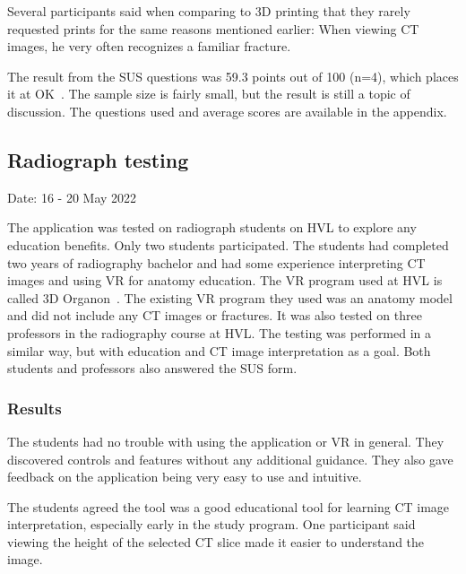 \documentclass[a4paper]{report}
\begin{document}
Several participants said when comparing to 3D printing that they rarely requested prints for the same reasons mentioned earlier: When viewing CT images, he very often recognizes a familiar fracture.



The result from the SUS questions was 59.3 points out of 100 (n=4), which places it at OK~\cite{bangor_empirical_2008}. The sample size is fairly small, but the result is still a topic of discussion. The questions used and average scores are available in the appendix.

\subsection{Radiograph testing}
Date: 16 - 20 May 2022

The application was tested on radiograph students on HVL to explore any education benefits. Only two students participated. The students had completed two years of radiography bachelor and had some experience interpreting CT images and using VR for anatomy education. The VR program used at HVL is called 3D Organon~\cite{organon_3d_nodate}.
The existing VR program they used was an anatomy model and did not include any CT images or fractures.
It was also tested on three professors in the radiography course at HVL.
The testing was performed in a similar way, but with education and CT image interpretation as a goal.
Both students and professors also answered the SUS form.

\subsubsection{Results}
The students had no trouble with using the application or VR in general. They discovered controls and features without any additional guidance. They also gave feedback on the application being very easy to use and intuitive.

The students agreed the tool was a good educational tool for learning CT image interpretation, especially early in the study program.
One participant said viewing the height of the selected CT slice made it easier to understand the image.
\end{document}
